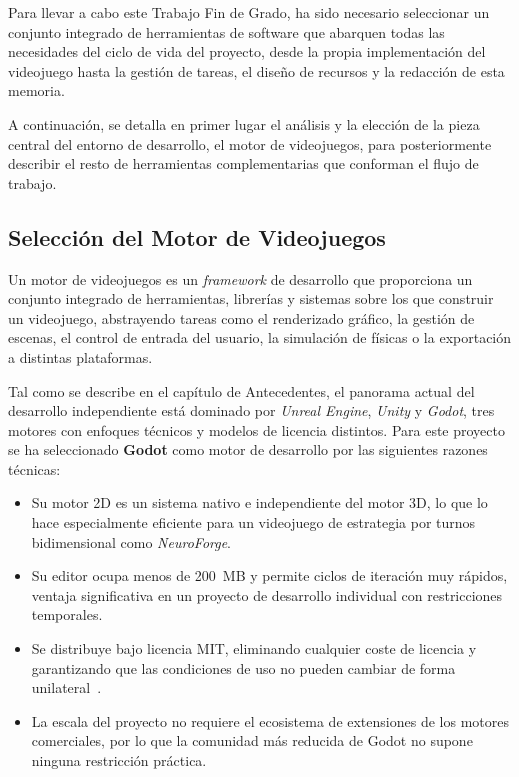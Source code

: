 Para llevar a cabo este Trabajo Fin de Grado, ha sido necesario seleccionar un conjunto integrado de herramientas de software que abarquen todas las necesidades del ciclo de vida del proyecto, desde la propia implementación del videojuego hasta la gestión de tareas, el diseño de recursos y la redacción de esta memoria. 

A continuación, se detalla en primer lugar el análisis y la elección de la pieza central del entorno de desarrollo, el motor de videojuegos, para posteriormente describir el resto de herramientas complementarias que conforman el flujo de trabajo.

\clearpage

\subsection{Selección del Motor de Videojuegos}

Un motor de videojuegos es un \textit{framework} de desarrollo que proporciona un conjunto integrado de herramientas, librerías y sistemas sobre los que construir un videojuego, abstrayendo tareas como el renderizado gráfico, la gestión de escenas, el control de entrada del usuario, la simulación de físicas o la exportación a distintas plataformas.

Tal como se describe en el capítulo de Antecedentes, el panorama actual del desarrollo independiente está dominado por \textit{Unreal Engine}, \textit{Unity} y \textit{Godot}, tres motores con enfoques técnicos y modelos de licencia distintos. Para este proyecto se ha seleccionado \textbf{Godot} como motor de desarrollo por las siguientes razones técnicas:

\begin{itemize}
	\item Su motor 2D es un sistema nativo e independiente del motor 3D, lo que lo hace especialmente eficiente para un videojuego de estrategia por turnos bidimensional como \textit{NeuroForge}.
	\item Su editor ocupa menos de 200~MB y permite ciclos de iteración muy rápidos, ventaja significativa en un proyecto de desarrollo individual con restricciones temporales.
	\item Se distribuye bajo licencia MIT, eliminando cualquier coste de licencia y garantizando que las condiciones de uso no pueden cambiar de forma unilateral~\cite{godot_features}.
	\item La escala del proyecto no requiere el ecosistema de extensiones de los motores comerciales, por lo que la comunidad más reducida de Godot no supone ninguna restricción práctica.
\end{itemize}

